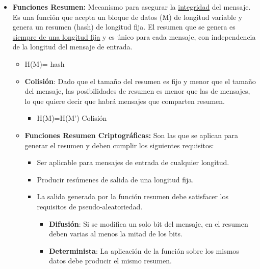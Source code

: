 \documentclass[12pt, twoside, openright]{report} %
\begin{document}
  \begin{itemize}
  \item \textbf{Funciones Resumen:} Mecanismo para asegurar la
    \underline{integridad} del mensaje. Es una función que acepta un
    bloque de datos (M) de longitud variable y genera un resumen (hash)
    de longitud fija. El resumen que se genera es \underline{siempre de
    una longitud fija} y es único para cada mensaje, con independencia
    de la longitud del mensaje de entrada.
    

    \begin{itemize}
    \item H(M)= hash
      
    \item \textbf{Colisión}: Dado que el tamaño del resumen es fijo y menor
      que el tamaño del mensaje, las posibilidades de resumen es menor
      que las de mensajes, lo que quiere decir que habrá mensajes que
      comparten resumen.
      

      \begin{itemize}
      \item H(M)=H(M') Colisión
        
      \end{itemize}
    \item \textbf{Funciones Resumen Criptográficas:} Son las que se aplican
      para generar el resumen y deben cumplir los siguientes requisitos:
      

      \begin{itemize}
      \item Ser aplicable para mensajes de entrada de cualquier longitud.
        
      \item Producir resúmenes de salida de una longitud fija.
        
      \item La salida generada por la función resumen debe satisfacer los
        requisitos de pseudo-aleatoriedad.
        

        \begin{itemize}
        \item \textbf{Difusión}: Si se modifica un solo bit del mensaje, en
          el resumen deben varias al menos la mitad de los bits.
          
        \item \textbf{Determinista}: La aplicación de la función sobre los
          mismos datos debe producir el mismo resumen.
          

\end{itemize}
\end{itemize}
\end{itemize}
\end{itemize}
\end{document}

